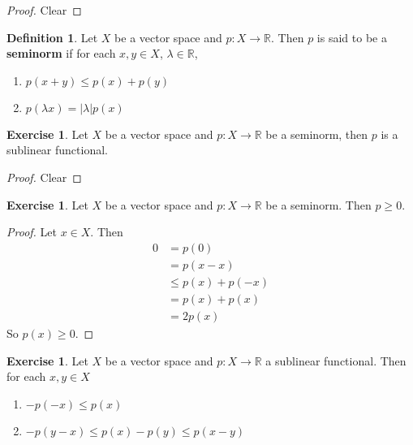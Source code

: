 \documentclass[12pt]{amsart}
\theoremstyle{definition}
\newtheorem{defn}[definition]{Definition}
\newtheorem{ex}[definition]{Exercise}
\newcommand{\lam}{\lambda}
\newcommand{\R}{\mathbb{R}}
\newcommand{\lex}[1]{\label{ex:#1}}
\newcommand{\ld}[1]{\label{defn:#1}}
\begin{document}
	\begin{proof}
	Clear
	\end{proof}
	
	\begin{defn} \ld{}
		Let $X$ be a vector space and $p:X \rightarrow \R$. Then $ p$ is said to be a \textbf{seminorm} if for each $x,y \in X$, $\lam \in \R$, 
		\begin{enumerate}
			\item $p(x+y) \leq p(x) + p(y)$
			\item $p(\lam x) = |\lam| p(x)$
		\end{enumerate}  
	\end{defn}
	
	\begin{ex} \lex{}
		Let $X$ be a vector space and $p: X \rightarrow \R$ be a seminorm, then $p$ is a sublinear functional.
	\end{ex}
	
	\begin{proof}
	Clear
	\end{proof}
	
	\begin{ex} \lex{}
	Let $X$ be a vector space and $p: X \rightarrow \R$ be a seminorm. Then $p \geq 0$. 
	\end{ex}
	
	\begin{proof}
	Let $x \in X$. Then 
	\begin{align*}
	0 
	&= p(0) \\ 
	&= p(x - x) \\
	&\leq  p(x) + p(-x) \\
	&= p(x) + p(x) \\
	&= 2p(x)
	\end{align*}
	So $p(x) \geq 0$.
	\end{proof}
	
	\begin{ex} \lex{}
	Let $X$ be a vector space and $p:X \rightarrow \R$ a sublinear functional. Then for each $x, y \in X$
	\begin{enumerate}
	\item $-p(-x) \leq p(x)$
	\item $- p(y-x) \leq p(x) - p(y) \leq p(x-y)$
	\end{enumerate}
	\end{ex}
	
\end{document}
